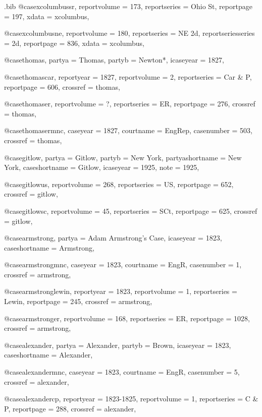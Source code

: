 \begin{filecontents*}[overwrite]{\jobname.bib}
@case{xcolumbussr,
  reportvolume = {173},
  reportseries = {Ohio St},
  reportpage = {197},
  xdata = {xcolumbus},
}

@case{xcolumbusne,
  reportvolume = {180},
  reportseries = {NE 2d},
  reportseriesseries = {2d},
  reportpage = {836},
  xdata = {xcolumbus},
}


@case{thomas,
  partya = {Thomas},
  partyb = {Newton*},
  icaseyear = {1827},
}

@case{thomascar,
  reportyear = {1827},
  reportvolume = {2},
  reportseries = {Car \& P},
  reportpage = {606},
  crossref = {thomas},
}

@case{thomaser,
  reportvolume = {?},
  reportseries = {ER},
  reportpage = {276},
  crossref = {thomas},
}

@case{thomasermnc,
  caseyear = {1827},
  courtname = {EngRep},
  casenumber = {503},
  crossref = {thomas},
}


@case{gitlow,
  partya = {Gitlow},
  partyb = {New York},%
  partyashortname = {New York}, 
  caseshortname = {Gitlow},
  icaseyear = {1925},
  note = {1925},
}


@case{gitlowus,
  reportvolume = {268},
  reportseries = {US},
  reportpage = {652},
  crossref = {gitlow},
}


@case{gitlowsc,
  reportvolume = {45},
  reportseries = {SCt},
  reportpage = {625},
  crossref = {gitlow},
}

@case{armstrong,
  partya = {Adam Armstrong's Case},
  icaseyear = {1823},
  caseshortname = {Armstrong},
}

@case{armstrongmnc,
  caseyear = {1823},
  courtname = {EngR},
  casenumber = {1},
  crossref = {armstrong},
}


@case{armstronglewin,
  reportyear = {1823},
  reportvolume = {1},
  reportseries = {Lewin},
  reportpage = {245},
  crossref = {armstrong},
}

@case{armstronger,
  reportvolume = {168},
  reportseries = {ER},
  reportpage = {1028},
  crossref = {armstrong},
}




@case{alexander,
  partya = {Alexander},
  partyb = {Brown},
  icaseyear = {1823},
  caseshortname = {Alexander},
}

@case{alexandermnc,
  caseyear = {1823},
  courtname = {EngR},
  casenumber = {5},
  crossref = {alexander},
}


@case{alexandercp,
  reportyear = {1823-1825},
  reportvolume = {1},
  reportseries = {C \& P},
  reportpage = {288},
  crossref = {alexander},
}


\end{filecontents*}
